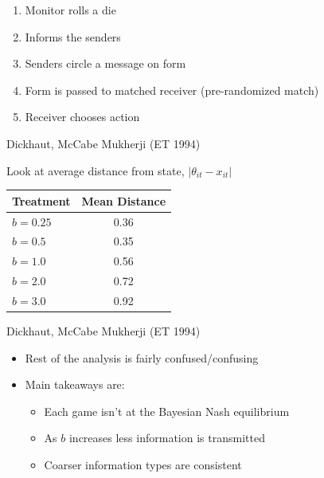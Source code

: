 \documentclass{beamer}
\begin{document}
\begin{frame}
    \begin{card}
    	\begin{enumerate}
    		\item Monitor rolls a die
    		\item Informs the senders
    		\item Senders circle a message on form
    		\item Form is passed to matched receiver (pre-randomized match)
    		\item Receiver chooses action
    	\end{enumerate}
	\end{card}
\end{frame}

\begin{frame}{Dickhaut, McCabe Mukherji (ET 1994)}
\begin{card}
Look at average distance from state, $\left|\theta_{it}-x_{it}\right|$

	\begin{center}
		\begin{tabular}{lc}\hline
		Treatment &  Mean Distance \\\hline
		 $b=0.25$ &  0.36 \\ 
		 $b=0.5$  &  0.35 \\
		 $b=1.0$  &  0.56 \\
		 $b=2.0$  &  0.72 \\
		 $b=3.0$  &  0.92 \\\hline
		 \end{tabular}
	 \end{center}
	\end{card}
\end{frame}

\begin{frame}{Dickhaut, McCabe Mukherji (ET 1994)}

\begin{card}
\begin{itemize}
	\item Rest of the analysis is fairly confused/confusing
	\item Main takeaways are:
	\begin{itemize}
		\item Each game isn't at the Bayesian Nash equilibrium
		\item As $b$ increases less information is transmitted
		\item Coarser information types are consistent
	\end{itemize}
\end{itemize}
\end{card}
\end{frame}
\end{document}
